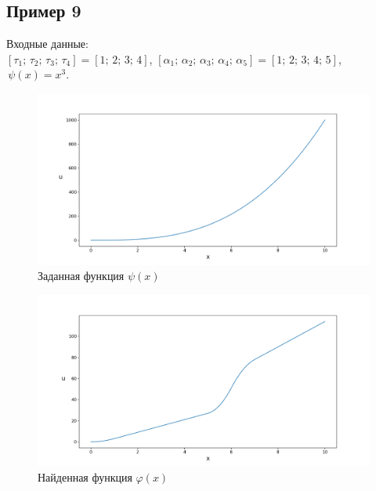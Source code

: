 \documentclass{article}
\theoremstyle{definition}
\begin{document}
\subsection{Пример 9}
Входные данные: \\
$[\tau_1;\, \tau_2;\, \tau_3;\, \tau_4] = [1;\, 2;\, 3;\, 4]$, 
$[\alpha_1;\, \alpha_2;\, \alpha_3;\, \alpha_4;\, \alpha_5] = [1;\, 2;\, 3;\, 4;\, 5]$, 
$\,\psi(x) = x^3$.
\begin{figure}[H]
	\centering
	\includegraphics[trim={2.475cm, 0, 0, 1.5cm}, clip, scale=0.624]{789_psi.png}
	\caption{Заданная функция $\psi(x)$}
	\label{fig:image17}
\end{figure}

\begin{figure}[H]
	\centering
	\includegraphics[trim={2.175cm, 0, 0, 1.5cm}, clip, scale=0.618]{8_u0.png}
	\caption{Найденная функция $\varphi(x)$}
	\label{fig:image18}
\end{figure}

\newpage
\end{document}
